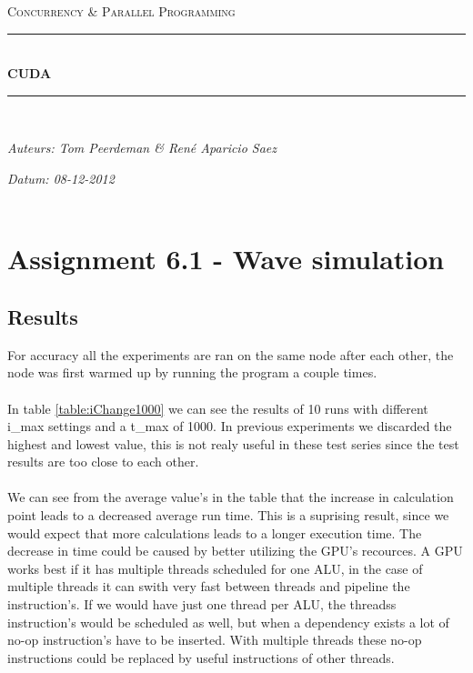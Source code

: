 \documentclass[a4paper]{article}
\newcommand{\HRule}{\rule{\linewidth}{0.5mm}}
\begin{document}
	\begin{titlepage}
	\begin{center}
		\textsc{\Large Concurrency \& Parallel Programming}\\[0.5cm]
		\HRule \\[0,4cm]
		\textsc{\huge \bfseries CUDA}
		\HRule \\[8cm]
		\begin{minipage}{0.4\textwidth}
			\begin{flushleft}\large
				\emph{Auteurs: Tom Peerdeman \& Ren\'e Aparicio Saez}\\
			\end{flushleft}
		\end{minipage}
		\begin{minipage}{0.4\textwidth}
			\begin{flushright}\large
			\emph{Datum: 08-12-2012\\\hspace{1cm}}\\
			\end{flushright}
		\end{minipage}
	\end{center}
	\end{titlepage}

\section{Assignment 6.1 - Wave simulation}
  
	\subsection{Results}
		For accuracy all the experiments are ran on the same node after each other, the node was first warmed up by running the program a couple times.\\
		\\
		In table \ref{table:iChange1000} we can see the results of 10 runs with different i\_max settings and a t\_max of 1000.
		In previous experiments we discarded the highest and lowest value, this is not realy useful in these test series since the test results are too close to each other.\\
		\\
		We can see from the average value's in the table that the increase in calculation point leads to a decreased average run time.
		This is a suprising result, since we would expect that more calculations leads to a longer execution time.
		The decrease in time could be caused by better utilizing the GPU's recources.
		A GPU works best if it has multiple threads scheduled for one ALU, in the case of multiple threads it can swith very fast between threads and pipeline the instruction's.
		If we would have just one thread per ALU, the threadss instruction's would be scheduled as well, but when a dependency exists a lot of no-op instruction's have to be inserted.
		With multiple threads these no-op instructions could be replaced by useful instructions of other threads.
		
\end{document}
